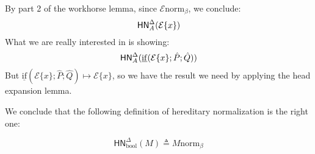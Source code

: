 \documentclass{article}
\newcommand{\bnorm}[1]{\ensuremath{#1 \mathrel{\text{norm}_\beta}}}
\newcommand{\hnorm}[3]{\ensuremath{\mathsf{HN}^{#1}_{#2}(#3)}}
\newcommand{\step}[2]{\ensuremath{#1 \mapsto #2}}
\newcommand{\booltype}{\text{bool}}
\newcommand{\E}{\mathcal{E}}
\newcommand{\ifexpr}[3]{\ensuremath{\mathrm{\underline{if}}(#1; #2; #3)}}
\begin{document}
By part 2 of the workhorse lemma, since \bnorm{\E}, we conclude:
\[
 \hnorm{\Delta}{A}{\E \{ x \}}\\
\]
What we are really interested in is showing:
\[
 \hnorm{\Delta}{A}{\ifexpr{\E \{ x \}}{\hat P}{\hat Q}} \\
\]
But \step{\ifexpr{\E \{ x \}}{\hat P}{\hat Q}}{\E \{ x \}}, so we have the result we need by applying the head expansion lemma.

We conclude that the following definition of hereditary normalization is the right one:

\[
\hnorm{\Delta}{\booltype}{M} \triangleq \bnorm{M}
\]





\end{document}
